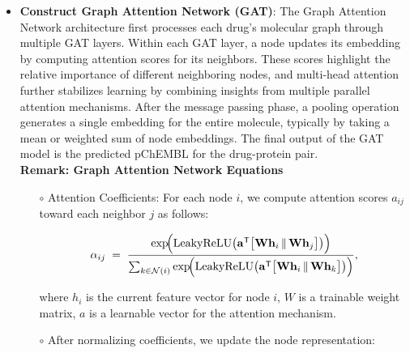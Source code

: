 \documentclass[fontsize=11pt]{article}
\begin{document}
\begin{itemize}

    \item \textbf{Construct Graph Attention Network (GAT)}: The Graph Attention Network architecture first processes each drug’s molecular graph through multiple GAT layers. Within each GAT layer, a node updates its embedding by computing attention scores for its neighbors. These scores highlight the relative importance of different neighboring nodes, and multi-head attention further stabilizes learning by combining insights from multiple parallel attention mechanisms. After the message passing phase, a pooling operation generates a single embedding for the entire molecule, typically by taking a mean or weighted sum of node embeddings. The final output of the GAT model is the predicted pChEMBL for the drug-protein pair. \\
    
    \small \textbf{Remark: Graph Attention Network Equations}

    \begin{itemize}
            \item[$\circ$] Attention Coefficients: For each node $i$, we compute attention scores $a_{ij}$ toward each neighbor $j$ as follows:

            \[
                \alpha_{ij} \;=\;
                \frac{\exp\!\Bigl(\mathrm{LeakyReLU}\bigl(\mathbf{a}^\mathsf{T}
                    \bigl[\mathbf{W}\mathbf{h}_i \,\|\, \mathbf{W}\mathbf{h}_j\bigr]\bigr)\Bigr)}
                     {\sum_{k \in \mathcal{N}(i)} \exp\!\Bigl(\mathrm{LeakyReLU}\bigl(\mathbf{a}^\mathsf{T}
                       \bigl[\mathbf{W}\mathbf{h}_i \,\|\, \mathbf{W}\mathbf{h}_k\bigr]\bigr)\Bigr)},
            \]

            where $h_i$ is the current feature vector for node $i$, $W$ is a trainable weight matrix, $a$ is a learnable vector for the attention mechanism.

            \item[$\circ$] After normalizing coefficients, we update the node representation: 


\end{itemize}
\end{itemize}
\end{document}
